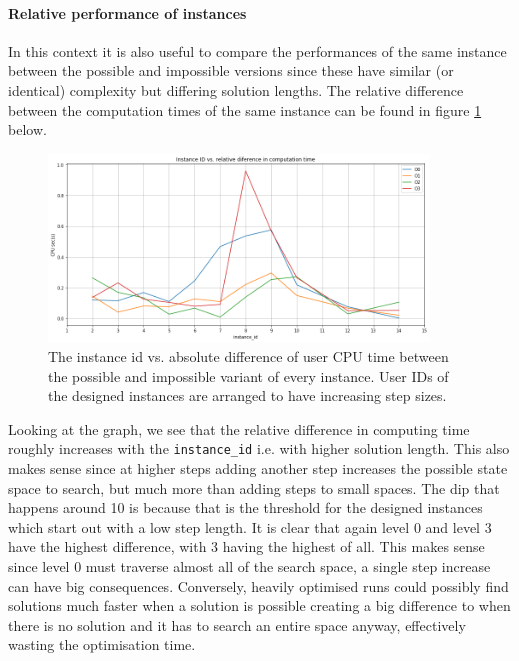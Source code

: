 \documentclass[british]{article}
\newcommand{\code}[1]{\texttt{#1}}
\begin{document}
	\paragraph{Relative performance of instances} In this context it is also useful to compare the performances of the same instance between the possible and impossible versions since these have similar (or identical) complexity but differing solution lengths. The relative difference between the computation times of the same instance can be found in figure \ref{idVsCPUSecDiffed} below.  
	\begin{figure}[!ht]
		\centering
		\includegraphics[width=0.9\textwidth]{idVsCPUSecDiffed}
		
		\caption{The instance id vs. absolute difference of user CPU time between the possible and impossible variant of every instance. User IDs of the designed instances are arranged to have increasing step sizes.}
		\label{idVsCPUSecDiffed}
	\end{figure}
	\FloatBarrier
	
	Looking at the graph, we see that the relative difference in computing time roughly increases with the \code{instance\_id} i.e. with higher solution length.  This also makes sense since at higher steps adding another step increases the possible state space to search, but much more than adding steps to small spaces. The dip that happens around 10 is because that is the threshold for the designed instances which start out with a low step length.  It is clear that again level 0 and level 3 have the highest difference, with 3 having the highest of all. This makes sense since level 0 must traverse almost all of the search space, a single step increase can have big consequences. Conversely, heavily optimised runs could possibly find solutions much faster when a solution is possible creating a big difference to when there is no solution and it has to search an entire space anyway, effectively wasting the optimisation time. 
	
\end{document}
